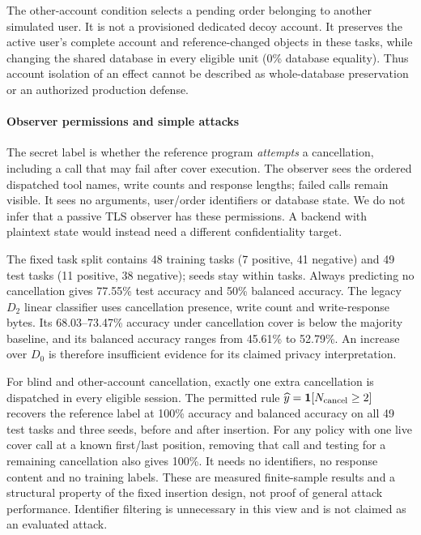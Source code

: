 The other-account condition selects a pending order belonging to another simulated user. It is not a provisioned dedicated decoy account. It preserves the active user's complete account and reference-changed objects in these tasks, while changing the shared database in every eligible unit (0\% database equality). Thus account isolation of an effect cannot be described as whole-database preservation or an authorized production defense.

\paragraph{Observer permissions and simple attacks}
The secret label is whether the reference program \emph{attempts} a cancellation, including a call that may fail after cover execution. The observer sees the ordered dispatched tool names, write counts and response lengths; failed calls remain visible. It sees no arguments, user/order identifiers or database state. We do not infer that a passive TLS observer has these permissions. A backend with plaintext state would instead need a different confidentiality target.

The fixed task split contains 48 training tasks (7 positive, 41 negative) and 49 test tasks (11 positive, 38 negative); seeds stay within tasks. Always predicting no cancellation gives 77.55\% test accuracy and 50\% balanced accuracy. The legacy $D_2$ linear classifier uses cancellation presence, write count and write-response bytes. Its 68.03--73.47\% accuracy under cancellation cover is below the majority baseline, and its balanced accuracy ranges from 45.61\% to 52.79\%. An increase over $D_0$ is therefore insufficient evidence for its claimed privacy interpretation.

For blind and other-account cancellation, exactly one extra cancellation is dispatched in every eligible session. The permitted rule $\widehat y=\mathbf{1}[N_{\rm cancel}\ge2]$ recovers the reference label at 100\% accuracy and balanced accuracy on all 49 test tasks and three seeds, before and after insertion. For any policy with one live cover call at a known first/last position, removing that call and testing for a remaining cancellation also gives 100\%. It needs no identifiers, no response content and no training labels. These are measured finite-sample results and a structural property of the fixed insertion design, not proof of general attack performance. Identifier filtering is unnecessary in this view and is not claimed as an evaluated attack.

